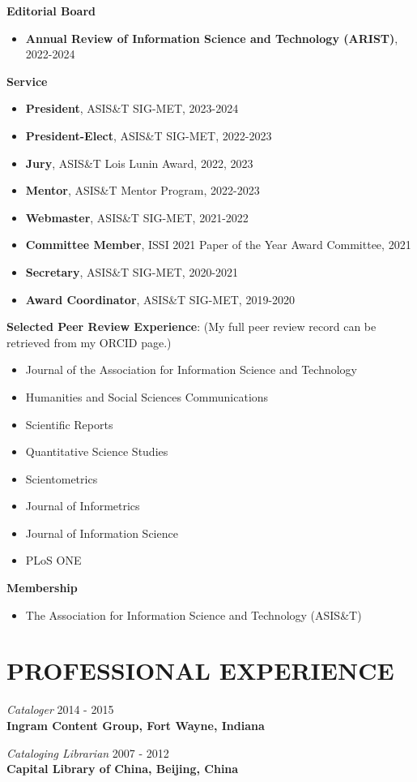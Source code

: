 \documentclass[margin, 10pt]{res} %
\begin{document}
\begin{resume}
\textbf{Editorial Board}
\begin{itemize}
\item \textbf{Annual Review of Information Science and Technology (ARIST)}, 2022-2024
\end{itemize}

\textbf{Service}
\begin{itemize}
\item \textbf{President}, ASIS\&T SIG-MET, 2023-2024
\item \textbf{President-Elect}, ASIS\&T SIG-MET, 2022-2023
\item \textbf{Jury}, ASIS\&T Lois Lunin Award, 2022, 2023
\item \textbf{Mentor}, ASIS\&T Mentor Program, 2022-2023
\item \textbf{Webmaster}, ASIS\&T SIG-MET, 2021-2022
\item \textbf{Committee Member}, ISSI 2021 Paper of the Year Award Committee, 2021
\item \textbf{Secretary}, ASIS\&T SIG-MET, 2020-2021
\item \textbf{Award Coordinator}, ASIS\&T SIG-MET, 2019-2020
\end{itemize}

\textbf{Selected Peer Review Experience}:  
(My full peer review record can be retrieved from my ORCID page.)

\begin{itemize}
\item Journal of the Association for Information Science and Technology
\item Humanities and Social Sciences Communications
\item Scientific Reports
\item Quantitative Science Studies
\item Scientometrics
\item Journal of Informetrics
\item Journal of Information Science
\item PLoS ONE
\end{itemize}

\textbf{Membership}
\begin{itemize}
\item The Association for Information Science and Technology (ASIS\&T)
\end{itemize}

\section{PROFESSIONAL EXPERIENCE}

\textit{Cataloger} \hfill 2014 - 2015\\
\textbf{Ingram Content Group, Fort Wayne, Indiana}

\textit{Cataloging Librarian} \hfill 2007 - 2012\\
\textbf{Capital Library of China, Beijing, China}



\end{resume}
\end{document}
